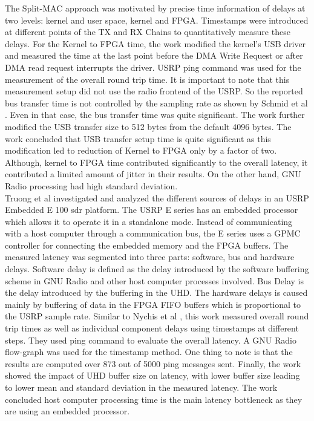 The Split-MAC approach was motivated by precise time information of delays at two levels: kernel and user space, kernel and FPGA.
Timestamps were introduced at different points of the TX and RX Chains to quantitatively measure these delays.
For the Kernel to FPGA time, the work modified the kernel's USB driver and measured the time at the last point before the DMA Write Request or after DMA read request interrupts the driver.
USRP ping command was used for the  measurement of the overall round trip time.
It is important to note that this measurement setup did not use the radio frontend of the USRP.
So the reported bus transfer time is not controlled by the sampling rate as shown by Schmid et al \cite{schmid_experimental_2007}.
Even in that case, the bus transfer time was quite significant.
The work further modified the USB transfer size to 512 bytes from the default 4096 bytes.
The work concluded that USB transfer setup time is quite significant as this modification led to reduction of Kernel to FPGA only by a factor of two.
Although, kernel to FPGA time contributed significantly to the overall latency, it contributed a limited amount of jitter in their results.
On the other hand, GNU Radio processing had high standard deviation.\\

Truong et al \cite{truong_investigating_2013} investigated and analyzed the different sources of delays in an USRP Embedded E 100 \ac{sdr} platform.
The USRP E series has an embedded processor which allows it to operate it in a standalone mode.
Instead of communicating with a host computer through a communication bus, the E series uses a  \ac{GPMC} controller for connecting the embedded memory and the \ac{FPGA} buffers.
The measured latency was segmented into three parts: software, bus and hardware delays.
Software delay is defined as the delay introduced by the software buffering scheme in GNU Radio and other host computer processes involved.
Bus Delay is the delay introduced by the buffering in the \ac{UHD}.
The hardware delays is caused mainly by buffering of data in the FPGA \ac{FIFO} buffers which is proportional to the USRP sample rate.
Similar to Nychis et al \cite{nychis_enabling_nodate}, this work measured overall round trip times as well as individual component delays using timestamps at different steps.
They used ping command to evaluate the overall latency.
A GNU Radio flow-graph was used for the timestamp method.
One thing to note is that the results are computed over 873 out of 5000 ping messages sent.   
Finally, the work showed the impact of \ac{UHD} buffer size on latency, with lower buffer size leading to lower mean and standard deviation in the measured latency.
The work concluded host computer processing time is the main latency bottleneck as they are using an embedded processor. \\




